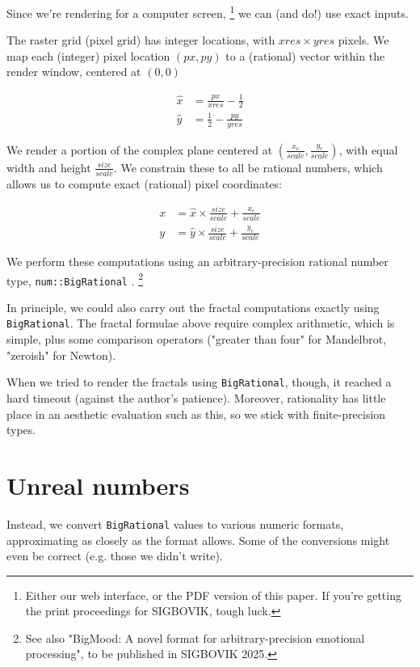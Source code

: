 \documentclass[sigconf,authorversion,nonacm]{acmart}
\begin{document}
Since we’re rendering for a computer screen,
\footnote{Either our web interface, or the PDF version of this paper. If you're getting the print proceedings for SIGBOVIK, tough luck.}
we can (and do!) use exact inputs.

The raster grid (pixel grid) has integer locations, with $xres \times yres$ pixels.
We map each (integer) pixel location $(px,py)$ to a (rational) vector within the render window, centered at $(0,0)$

\begin{align*}
\hat{x} &= \frac{px}{xres} - \frac{1}{2} \\
\hat{y} &= \frac{1}{2} - \frac{py}{yres}
\end{align*}

We render a portion of the complex plane centered at $(\frac{x_c}{scale}, \frac{y_c}{scale})$, with equal width and height $\frac{size}{scale}$.
We constrain these to all be
rational numbers, which allows us to compute exact (rational) pixel coordinates:

\begin{align*}
x &= \hat{x} \times \frac{size}{scale} + \frac{x_c}{scale} \\
y &= \hat{y} \times \frac{size}{scale} + \frac{y
_c}{scale}
\end{align*}

We perform these computations using an arbitrary-precision rational number type, \texttt{num::BigRational} \cite{rust:num}.
\footnote{See also "BigMood: A novel format for arbitrary-precision emotional processing", to be published in SIGBOVIK 2025.}

In principle, we could also carry out the fractal computations exactly
using \texttt{BigRational}. The fractal formulae above require complex arithmetic,
which is simple,  plus some comparison operators ("greater than four" for Mandelbrot, "zeroish" for Newton).

When we tried to render the fractals using \texttt{BigRational}, though,
it reached a hard timeout (against the author's patience). Moreover, rationality has little place in an aesthetic evaluation such as this, so we stick
with finite-precision types.

\section{Unreal numbers}

Instead, we convert
\texttt{BigRational} values to various numeric formats,
approximating as closely as the format allows.
Some of the conversions might even be correct
(e.g. those we didn't write).
\end{document}
